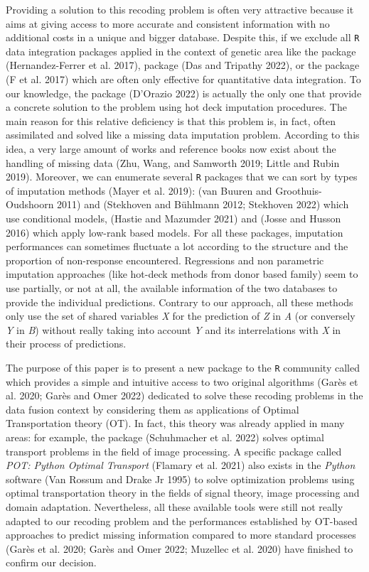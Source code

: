 Providing a solution to this recoding problem is often very attractive because it aims at giving access to more accurate and consistent information with no additional costs in a unique and bigger database. Despite this, if we exclude all \texttt{R} data integration packages applied in the context of genetic area like the  package (Hernandez-Ferrer et al. 2017),  package (Das and Tripathy 2022), or the  package (F et al. 2017) which are often only effective for quantitative data integration. To our knowledge, the  package (D'Orazio 2022) is actually the only one that provide a concrete solution to the problem using hot deck imputation procedures. The main reason for this relative deficiency is that this problem is, in fact, often assimilated and solved like a missing data imputation problem. According to this idea, a very large amount of works and reference books now exist about the handling of missing data (Zhu, Wang, and Samworth 2019; Little and Rubin 2019). Moreover, we can enumerate several \texttt{R} packages that we can sort by types of imputation methods (Mayer et al. 2019):  (van Buuren and Groothuis-Oudshoorn 2011) and  (Stekhoven and Bühlmann 2012; Stekhoven 2022) which use conditional models,  (Hastie and Mazumder 2021) and  (Josse and Husson 2016) which apply low-rank based models. For all these packages, imputation performances can sometimes fluctuate a lot according to the structure and the proportion of non-response encountered. Regressions and non parametric imputation approaches (like hot-deck methods from donor based family) seem to use partially, or not at all, the available information of the two databases to provide the individual predictions. Contrary to our approach, all these methods only use the set of shared variables \emph{X} for the prediction of \emph{Z} in \emph{A} (or conversely \emph{Y} in \emph{B}) without really taking into account \emph{Y} and its interrelations with \emph{X} in their process of predictions.

The purpose of this paper is to present a new package to the \texttt{R} community called  which provides a simple and intuitive access to two original algorithms (Garès et al. 2020; Garès and Omer 2022) dedicated to solve these recoding problems in the data fusion context by considering them as applications of Optimal Transportation theory (OT). In fact, this theory was already applied in many areas: for example, the  package (Schuhmacher et al. 2022) solves optimal transport problems in the field of image processing. A specific package called \emph{POT: Python Optimal Transport} (Flamary et al. 2021) also exists in the \emph{Python} software (Van Rossum and Drake Jr 1995) to solve optimization problems using optimal transportation theory in the fields of signal theory, image processing and domain adaptation. Nevertheless, all these available tools were still not really adapted to our recoding problem and the performances established by OT-based approaches to predict missing information compared to more standard processes (Garès et al. 2020; Garès and Omer 2022; Muzellec et al. 2020) have finished to confirm our decision.

